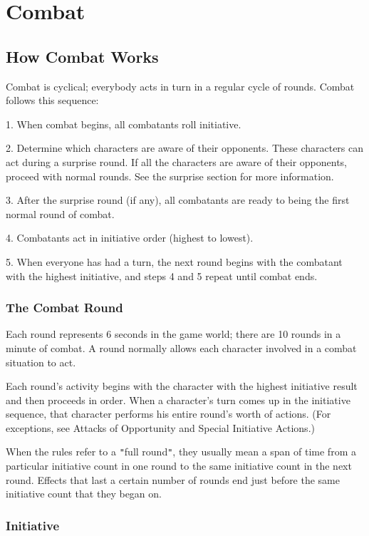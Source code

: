 \chapter{Combat}
\section{How Combat Works}

\label{f0}				
Combat is cyclical; everybody acts in turn in a regular cycle of rounds. Combat follows this sequence:
				
1. When combat begins, all combatants roll initiative.
				
2. Determine which characters are aware of their opponents. These characters can act during a surprise round. If all the characters are aware of their opponents, proceed with normal rounds. See the surprise section for more information.
				
3. After the surprise round (if any), all combatants are ready to being the first normal round of combat.
				
4. Combatants act in initiative order (highest to lowest).
				
5. When everyone has had a turn, the next round begins with the combatant with the highest initiative, and steps 4 and 5 repeat until combat ends.
				
\subsection{The Combat Round}

				
Each round represents 6 seconds in the game world; there are 10 rounds in a minute of combat. A round normally allows each character involved in a combat situation to act. 
				
Each round's activity begins with the character with the highest initiative result and then proceeds in order. When a character's turn comes up in the initiative sequence, that character performs his entire round's worth of actions. (For exceptions, see Attacks of Opportunity and Special Initiative Actions.)
				
When the rules refer to a \texttt{{}"{}}full round\texttt{{}"{}}, they usually mean a span of time from a particular initiative count in one round to the same initiative count in the next round. Effects that last a certain number of rounds end just before the same initiative count that they began on.
				
\subsection{Initiative}

